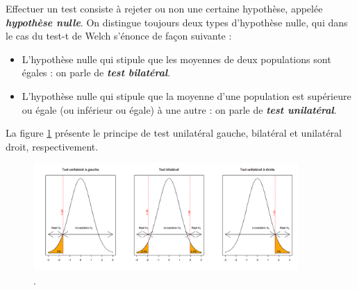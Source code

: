 \documentclass[10pt, oneside, a4paper]{article}
\begin{document}
Effectuer un test consiste à rejeter ou non une certaine hypothèse, appelée \textbf{\textit{hypothèse nulle}}. On distingue toujours deux types d'hypothèse nulle, qui dans le cas du test-t de Welch s'énonce de façon suivante :
\begin{itemize}
\item L'hypothèse nulle qui stipule que les moyennes de deux populations sont égales : on parle de \textbf{\textit{test bilatéral}}.
\item L'hypothèse nulle qui stipule que la moyenne d'une population est supérieure ou égale (ou inférieur ou égale) à une autre : on parle de \textbf{\textit{test unilatéral}}. \\
\end{itemize}
La figure \ref{fig:bi_uni} présente le principe de test unilatéral gauche, bilatéral et unilatéral droit, respectivement.
\begin{figure}[htbp]
    \centering
    \includegraphics[width=0.9\textwidth]{image/bi_uni}    
    \caption{.}    
    \label{fig:bi_uni}
\end{figure}
\end{document}
